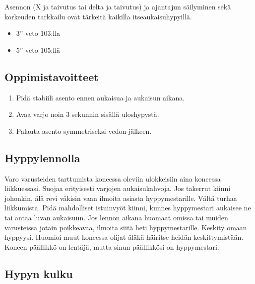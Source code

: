 \begin{multicols}{2}
Asennon (X ja taivutus tai delta ja taivutus) ja ajantajun säilyminen sekä korkeuden tarkkailu ovat tärkeitä kaikilla itseaukaisuhypyillä. 

\begin{itemize}
\item  3'' veto 103:lla 
\item  5'' veto 105:llä 
\end{itemize}
\subsection{ Oppimistavoitteet }
\label{pl-alkeiskoulutuksen-suoritukset-oppimistavoitteet}

\begin{enumerate}[label=\bfseries \arabic*)]
\item  Pidä stabiili asento ennen aukaisua ja aukaisun aikana. 
\item  Avaa varjo noin 3 sekunnin sisällä uloshypystä. 
\item  Palauta asento symmetriseksi vedon jälkeen. 
\end{enumerate}
\subsection{ Hyppylennolla }
\label{pl-alkeiskoulutuksen-suoritukset-hyppylennolla}


Varo varusteiden tarttumista koneessa oleviin ulokkeisiin aina koneessa liikkuessasi. Suojaa erityisesti varjojen aukaisukahvoja. Jos takerrut kiinni johonkin, älä revi väkisin vaan ilmoita asiasta hyppymestarille. Vältä turhaa liikkumista. Pidä mahdolliset istuinvyöt kiinni, kunnes hyppymestari aukaisee ne tai antaa luvan aukaisuun. Jos lennon aikana huomaat omissa tai muiden varusteissa jotain poikkeavaa, ilmoita siitä heti hyppymestarille. Keskity omaan hyppyysi. Huomioi muut koneessa olijat äläkä häiritse heidän keskittymistään. Koneen päällikkö on lentäjä, mutta sinun päällikkösi on hyppymestari. 

\subsection{ Hypyn kulku }
\label{pl-alkeiskoulutuksen-suoritukset-hypyn-kulku}


\end{multicols}
